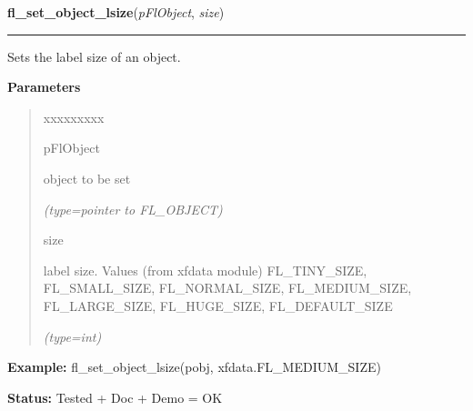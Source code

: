     \label{xformslib:flbasic:fl_set_object_lsize}

    \vspace{0.5ex}

\hspace{.8\funcindent}\begin{boxedminipage}{\funcwidth}

    \raggedright \textbf{fl\_set\_object\_lsize}(\textit{pFlObject}, \textit{size})

    \vspace{-1.5ex}

    \rule{\textwidth}{0.5\fboxrule}
\setlength{\parskip}{2ex}
    Sets the label size of an object.

\setlength{\parskip}{1ex}
      \textbf{Parameters}
      \vspace{-1ex}

      \begin{quote}
        \begin{Ventry}{xxxxxxxxx}

          \item[pFlObject]

          object to be set

            {\it (type=pointer to FL\_OBJECT)}

          \item[size]

          label size. Values (from xfdata module) FL\_TINY\_SIZE, 
          FL\_SMALL\_SIZE, FL\_NORMAL\_SIZE, FL\_MEDIUM\_SIZE, 
          FL\_LARGE\_SIZE, FL\_HUGE\_SIZE, FL\_DEFAULT\_SIZE

            {\it (type=int)}

        \end{Ventry}

      \end{quote}

\textbf{Example:} fl\_set\_object\_lsize(pobj, xfdata.FL\_MEDIUM\_SIZE)



\textbf{Status:} Tested + Doc + Demo = OK



    \end{boxedminipage}

    \label{xformslib:flbasic:fl_get_object_lsize}

